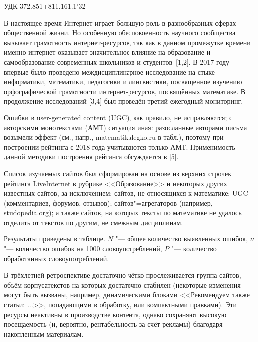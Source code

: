 \small УДК 372.851+811.161.1'32
\vzmscaption


В настоящее время Интернет играет большую роль в разнообразных сферах общественной жизни. Но особенную
обеспокоенность научного сообщества вызывает грамотность интернет-ресурсов, так как в данном промежутке
времени именно интернет оказывает значительное влияние на образование и самообразование современных школьников и
студентов~[1,2].
В 2017 году впервые было проведено междисциплинарное исследование на стыке информатики, математики, педагогики и
лингвистики, посвященное изучению орфографической грамотности интернет-ресурсов, посвящённых математике.
В продолжение исследований [3,4] был проведён третий ежегодный мониторинг.

Ошибки в user-generated content (UGC), как правило, не исправляются;
с авторскими монотекстами (АМТ) ситуация иная:
разосланные авторами письма возымели эффект
(см., напр., \linebreak matematikalegko.ru в табл.),
поэтому при построении рейтинга с 2018 года учитываются только АМТ.
Применимость данной методики построения рейтинга обсуждается в [5].

Список изучаемых сайтов был сформирован на основе из верхних строчек рейтинга LiveInternet в рубрике <<Образование>>
и некоторых других известных сайтов,
за исключением:
сайтов, не относящихся к математике;
UGC (комментариев, форумов, отзывов);
сайтов"=агрегаторов (например, studopedia.org);
а также сайтов, на которых тексты по математике не удалось отделить от текстов по другим,
не смежным дисциплинам.

Результаты приведены в таблице.
$N$ "--- общее количество выявленных ошибок,
$\nu$ "--- количество ошибок на 1000 словоупотреблений,
$P$ "--- количество обработанных словоупотреблений.

В трёхлетней ретроспективе достаточно чётко прослеживается группа сайтов,
объём корпусатекстов на которых достаточно стабилен
(некоторые изменения могут быть вызваны, например,
динамическими блоками <<Рекомендуем также статьи: ...>>,
попадающими в обработку,
или компактными правками).
Эти ресурсы неактивны в производстве контента,
однако сохраняют высокую посещаемость (и, вероятно, рентабельность за счёт рекламы)
благодаря накопленным материалам.

